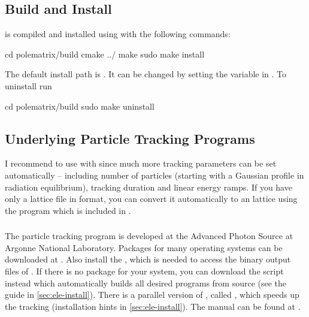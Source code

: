 \documentclass[a4paper]{scrartcl}
\begin{document}
\subsection{Build and Install \polem}
\label{sec:build}
\polem is compiled and installed using  with the following commands:
\begin{bashcode}
  cd polematrix/build
  cmake ../
  make
  sudo make install
\end{bashcode}
The default install path is . It can be changed by setting the
 variable in .
%
To uninstall \polem run
\begin{bashcode}
  cd polematrix/build
  sudo make uninstall
\end{bashcode}



\subsection{Underlying Particle Tracking Programs}
\label{sec:elemadx}

I recommend to use \polem with \ele since much more tracking parameters can be set
automatically -- including number of particles (starting with a Gaussian profile in
radiation equilibrium), tracking duration and linear energy ramps. If you have only a
lattice file in \madx format, you can convert it automatically to an \ele lattice
using the program  which is included in \pal \cite{palattice}.

\subsubsection{\ele}
\label{sec:ele}
The particle tracking program \ele \cite{elegant} is developed at the Advanced Photon
Source at Argonne National Laboratory. Packages for many operating systems can be
downloaded at \cite{elegant-download}. Also install the , which is
needed to access the binary output files of \ele.
%
If there is no package for your system, you can download the 
script instead which automatically builds all desired programs from source (see the guide
in \cref{sec:ele-install}).
%
There is a parallel version of \ele, called , which speeds up the
tracking \cite{pelegant} (installation hints in \cref{sec:ele-install}). The \ele manual
can be found at \cite{elegant-manual}.
\end{document}
